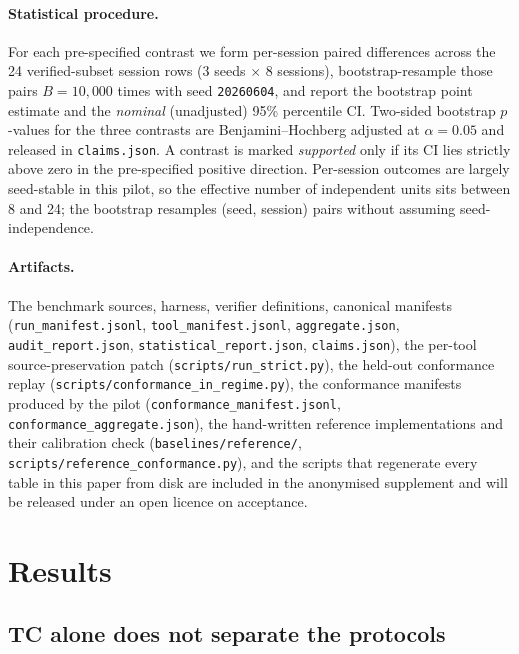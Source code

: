 \documentclass[sigconf,anonymous,review,natbib=false]{acmart}
\begin{document}
\paragraph{Statistical procedure.}
For each pre-specified contrast we form per-session paired differences across the 24 verified-subset session rows (3 seeds $\times$ 8 sessions), bootstrap-resample those pairs $B{=}10{,}000$ times with seed \texttt{20260604}, and report the bootstrap point estimate and the \emph{nominal} (unadjusted) 95\% percentile CI. Two-sided bootstrap $p$-values for the three contrasts are Benjamini--Hochberg adjusted at $\alpha{=}0.05$ and released in \texttt{claims.json}. A contrast is marked \emph{supported} only if its CI lies strictly above zero in the pre-specified positive direction. Per-session outcomes are largely seed-stable in this pilot, so the effective number of independent units sits between 8 and 24; the bootstrap resamples (seed, session) pairs without assuming seed-independence.

\paragraph{Artifacts.}
The benchmark sources, harness, verifier definitions, canonical manifests (\texttt{run\_manifest.jsonl}, \texttt{tool\_manifest.jsonl}, \texttt{aggregate.json}, \texttt{audit\_report.json}, \texttt{statistical\_report.json}, \texttt{claims.json}), the per-tool source-preservation patch (\texttt{scripts/run\_strict.py}), the held-out conformance replay (\texttt{scripts/conformance\_in\_regime.py}), the conformance manifests produced by the pilot (\texttt{conformance\_manifest.jsonl}, \texttt{conformance\_aggregate.json}), the hand-written reference implementations and their calibration check (\texttt{baselines/reference/}, \texttt{scripts/reference\_conformance.py}), and the scripts that regenerate every table in this paper from disk are included in the anonymised supplement and will be released under an open licence on acceptance.

\section{Results}
\label{sec:results}



\subsection{TC alone does not separate the protocols}
\end{document}
